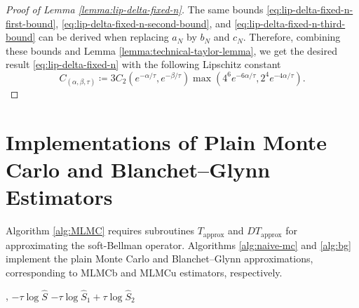 \documentclass[11pt]{article}
\numberwithin{equation}{section}
\theoremstyle{definition}
\theoremstyle{remark}
\def\N{{\mathbb{N}}}
\begin{document}
\begin{proof}[Proof of Lemma \ref{lemma:lip-delta-fixed-n}]
    The same bounds \eqref{eq:lip-delta-fixed-n-first-bound}, \eqref{eq:lip-delta-fixed-n-second-bound}, and \eqref{eq:lip-delta-fixed-n-third-bound} can be derived when replacing $a_N$ by $b_N$ and $c_N$. Therefore, combining these bounds and Lemma \ref{lemma:technical-taylor-lemma}, we get the desired result \eqref{eq:lip-delta-fixed-n} with the following Lipschitz constant
    \begin{equation}
        \label{eq:lipschitz-constant-c(a,b,t)}
        C_{(\alpha, \beta, \tau)} \coloneqq  3 C_2(e^{-\alpha / \tau}, e^{-\beta/ \tau}) \max(4^6 e^{-6\alpha/\tau}, 2^4 e^{-4\alpha / \tau}).
    \end{equation}
\end{proof}


\section{Implementations of Plain Monte Carlo and Blanchet--Glynn Estimators}
\label{app:algos}

Algorithm \ref{alg:MLMC} requires subroutines $T_{\mathrm{approx}}$ and $DT_{\mathrm{approx}}$ for approximating the soft-Bellman operator.   Algorithms \ref{alg:naive-mc} and \ref{alg:bg}  implement the plain Monte Carlo and Blanchet--Glynn approximations, corresponding to MLMCb and MLMCu estimators, respectively.

\begin{algorithm}
    \caption{Approximation of $T$ based on plain Monte Carlo average}\label{alg:naive-mc}
    \begin{algorithmic}
        \Require{$\tau > 0, K \in \N^*, \mu \in \mathcal P (A)$},
        \State\Return $-\tau \log \hat{S}$
        \EndProcedure
         \State\Return $-\tau \log \hat{S}_1  + \tau \log \hat{S}_2$
        \EndProcedure
    \end{algorithmic}
\end{algorithm}
\end{document}
